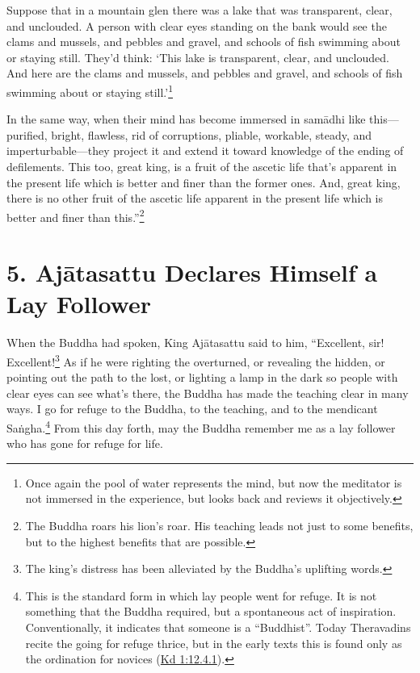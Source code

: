 \documentclass[12pt,openany]{book}%
\begin{document}
Suppose that in a mountain glen there was a lake that was transparent, clear, and unclouded. A person with clear eyes standing on the bank would see the clams and mussels, and pebbles and gravel, and schools of fish swimming about or staying still. They’d think: ‘This lake is transparent, clear, and unclouded. And here are the clams and mussels, and pebbles and gravel, and schools of fish swimming about or staying still.’\footnote{Once again the pool of water represents the mind, but now the meditator is not immersed in the experience, but looks back and reviews it objectively. } 

In the same way, when their mind has become immersed in \textsanskrit{samādhi} like this—purified, bright, flawless, rid of corruptions, pliable, workable, steady, and imperturbable—they project it and extend it toward knowledge of the ending of defilements. This too, great king, is a fruit of the ascetic life that’s apparent in the present life which is better and finer than the former ones. And, great king, there is no other fruit of the ascetic life apparent in the present life which is better and finer than this.”\footnote{The Buddha roars his lion’s roar. His teaching leads not just to some benefits, but to the highest benefits that are possible. } 

\section*{5. \textsanskrit{Ajātasattu} Declares Himself a Lay Follower }

When the Buddha had spoken, King \textsanskrit{Ajātasattu} said to him, “Excellent, sir! Excellent!\footnote{The king’s distress has been alleviated by the Buddha’s uplifting words. } As if he were righting the overturned, or revealing the hidden, or pointing out the path to the lost, or lighting a lamp in the dark so people with clear eyes can see what’s there, the Buddha has made the teaching clear in many ways. I go for refuge to the Buddha, to the teaching, and to the mendicant \textsanskrit{Saṅgha}.\footnote{This is the standard form in which lay people went for refuge. It is not something that the Buddha required, but a spontaneous act of inspiration. Conventionally, it indicates that someone is a “Buddhist”. Today Theravadins recite the going for refuge thrice, but in the early texts this is found only as the ordination for novices (\href{https://suttacentral.net/pli-tv-kd1/en/sujato\#12.4.1}{Kd 1:12.4.1}). } From this day forth, may the Buddha remember me as a lay follower who has gone for refuge for life. 
\end{document}
